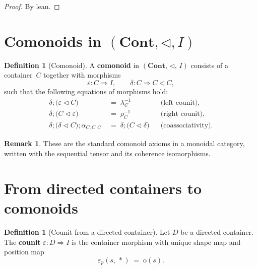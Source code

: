 \documentclass[11pt,a4paper]{article}
\theoremstyle{plain}
\theoremstyle{definition}
\newtheorem{definition}[theorem]{Definition}
\newtheorem{remark}[theorem]{Remark}
\newcommand{\Cont}{\mathbf{Cont}}
\newcommand{\rootp}{\mathrm{o}}
\begin{document}
\begin{proof}
By lean.
\end{proof}

\section{Comonoids in $(\Cont, \triangleleft, I)$}

\begin{definition}[Comonoid]\label{def:comonoid}
A \textbf{comonoid} in $(\Cont,\, \triangleleft,\, I)$ consists of a
container~$C$ together with morphisms
\begin{equation}
  \varepsilon : C \Rightarrow I,
  \qquad
  \delta : C \Rightarrow C \mathbin{\triangleleft} C,
\end{equation}
such that the following equations of morphisms hold:
\begin{align}
  \delta ; \bigl(\varepsilon \mathbin{\triangleleft} C\bigr)
  &\;=\;
  \lambda_C^{-1}
  &&\text{(left counit),} \\[4pt]
  \delta ; \bigl(C \mathbin{\triangleleft} \varepsilon\bigr)
  &\;=\;
  \rho_C^{-1}
  &&\text{(right counit),} \\[4pt]
  \delta ; \bigl(\delta \mathbin{\triangleleft} C\bigr) ; \alpha_{C,C,C}
  &\;=\;
  \delta ; \bigl(C \mathbin{\triangleleft} \delta\bigr)
  &&\text{(coassociativity).}
\end{align}
\end{definition}

\begin{remark}
These are the standard comonoid axioms in a monoidal category, written with
the sequential tensor and its coherence isomorphisms.
\end{remark}

\section{From directed containers to comonoids}

\begin{definition}[Counit from a directed container]\label{def:counit}
Let $D$ be a directed container. The \textbf{counit}
$\varepsilon : D \Rightarrow I$ is the container morphism with unique shape
map and position map
\begin{equation}
  \varepsilon_p(s,\, \ast) \;=\; \rootp(s).
\end{equation}
\end{definition}
\end{document}
